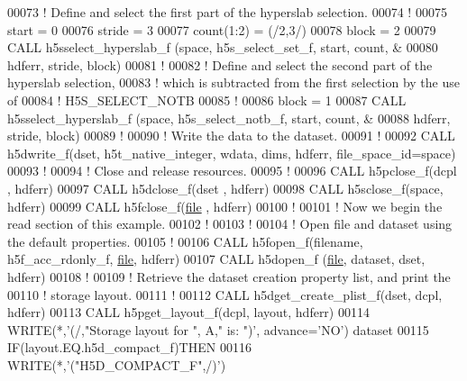\begin{DoxyCode}
00073   \textcolor{comment}{! Define and select the first part of the hyperslab selection.}
00074   \textcolor{comment}{!}
00075   start = 0
00076   stride = 3
00077   count(1:2) = (/2,3/)
00078   block = 2
00079   \textcolor{keyword}{CALL }h5sselect\_hyperslab\_f (space, h5s\_select\_set\_f, start, count, &
00080        hdferr, stride, block)
00081   \textcolor{comment}{!}
00082   \textcolor{comment}{! Define and select the second part of the hyperslab selection,}
00083   \textcolor{comment}{! which is subtracted from the first selection by the use of}
00084   \textcolor{comment}{! H5S\_SELECT\_NOTB}
00085   \textcolor{comment}{!}
00086   block = 1
00087   \textcolor{keyword}{CALL }h5sselect\_hyperslab\_f (space, h5s\_select\_notb\_f, start, count, &
00088        hdferr, stride, block)
00089   \textcolor{comment}{!}
00090   \textcolor{comment}{! Write the data to the dataset.}
00091   \textcolor{comment}{!}
00092   \textcolor{keyword}{CALL }h5dwrite\_f(dset, h5t\_native\_integer, wdata, dims, hdferr, file\_space\_id=space)
00093   \textcolor{comment}{!}
00094   \textcolor{comment}{! Close and release resources.}
00095   \textcolor{comment}{!}
00096   \textcolor{keyword}{CALL }h5pclose\_f(dcpl , hdferr)
00097   \textcolor{keyword}{CALL }h5dclose\_f(dset , hdferr)
00098   \textcolor{keyword}{CALL }h5sclose\_f(space, hdferr)
00099   \textcolor{keyword}{CALL }h5fclose\_f(\hyperlink{structfile}{file} , hdferr)
00100   \textcolor{comment}{!}
00101   \textcolor{comment}{! Now we begin the read section of this example.}
00102   \textcolor{comment}{!}
00103   \textcolor{comment}{!}
00104   \textcolor{comment}{! Open file and dataset using the default properties.}
00105   \textcolor{comment}{!}
00106   \textcolor{keyword}{CALL }h5fopen\_f(filename, h5f\_acc\_rdonly\_f, \hyperlink{structfile}{file}, hdferr)
00107   \textcolor{keyword}{CALL }h5dopen\_f (\hyperlink{structfile}{file}, dataset, dset, hdferr)
00108   \textcolor{comment}{!}
00109   \textcolor{comment}{! Retrieve the dataset creation property list, and print the}
00110   \textcolor{comment}{! storage layout.}
00111   \textcolor{comment}{!}
00112   \textcolor{keyword}{CALL }h5dget\_create\_plist\_f(dset, dcpl, hdferr)
00113   \textcolor{keyword}{CALL }h5pget\_layout\_f(dcpl, layout, hdferr)
00114   \textcolor{keyword}{WRITE}(*,\textcolor{stringliteral}{'(/,"Storage layout for ", A," is: ")'}, advance=\textcolor{stringliteral}{'NO'}) dataset
00115   \textcolor{keywordflow}{IF}(layout.EQ.h5d\_compact\_f)\textcolor{keywordflow}{THEN}
00116      \textcolor{keyword}{WRITE}(*,\textcolor{stringliteral}{'("H5D\_COMPACT\_F",/)'})

\end{DoxyCode}
